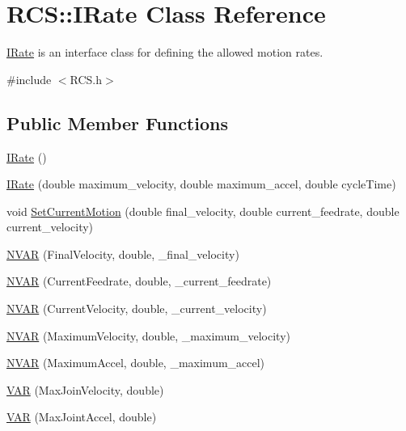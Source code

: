 \hypertarget{classRCS_1_1IRate}{\section{R\-C\-S\-:\-:I\-Rate Class Reference}
\label{classRCS_1_1IRate}
}


\hyperlink{classRCS_1_1IRate}{I\-Rate} is an interface class for defining the allowed motion rates.  




{\ttfamily \#include $<$R\-C\-S.\-h$>$}

\subsection*{Public Member Functions}
\begin{DoxyCompactItemize}
\item 
\hyperlink{classRCS_1_1IRate_a4b97dc61d1a56d724388597b846d460d}{I\-Rate} ()
\item 
\hyperlink{classRCS_1_1IRate_a747c44ccc87f3bf67f41a550e65427ac}{I\-Rate} (double maximum\-\_\-velocity, double maximum\-\_\-accel, double cycle\-Time)
\item 
void \hyperlink{classRCS_1_1IRate_ac1be2fc9a2504d899351aec2b1eba292}{Set\-Current\-Motion} (double final\-\_\-velocity, double current\-\_\-feedrate, double current\-\_\-velocity)
\item 
\hyperlink{classRCS_1_1IRate_ad0ca5499d9841abc508181139e44d266}{N\-V\-A\-R} (Final\-Velocity, double, \-\_\-final\-\_\-velocity)
\item 
\hyperlink{classRCS_1_1IRate_a20721ff591cfb9cb4deecad878112347}{N\-V\-A\-R} (Current\-Feedrate, double, \-\_\-current\-\_\-feedrate)
\item 
\hyperlink{classRCS_1_1IRate_ad6a70ec516f6837ab4ba40ee21a2d640}{N\-V\-A\-R} (Current\-Velocity, double, \-\_\-current\-\_\-velocity)
\item 
\hyperlink{classRCS_1_1IRate_a42d0df4efb1dd51ed77ff49a08bc6e63}{N\-V\-A\-R} (Maximum\-Velocity, double, \-\_\-maximum\-\_\-velocity)
\item 
\hyperlink{classRCS_1_1IRate_ac744911b4ec40f584b24af0ede9eab9e}{N\-V\-A\-R} (Maximum\-Accel, double, \-\_\-maximum\-\_\-accel)
\item 
\hyperlink{classRCS_1_1IRate_a3973b5ffabc9847644238069893e92ae}{V\-A\-R} (Max\-Join\-Velocity, double)
\item 
\hyperlink{classRCS_1_1IRate_a0acd6974dfc47c1f11b2fe5abe823235}{V\-A\-R} (Max\-Joint\-Accel, double)

\end{DoxyCompactItemize}
